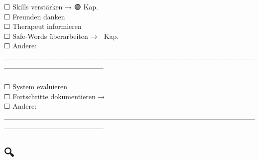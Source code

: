 \hfill\break
\hfill\break

\hypertarget{diese-woche}{%
\subsubsection[\textbf{\textcolor{ctmmBlue}{\1}}]{\texorpdfstring{\protect\hypertarget{diese-woche}{}{}\textbf{\textcolor{ctmmBlue}{\1}}}{Diese Woche:}}\label{diese-woche}}

☐ Skills verstärken → 🟢 Kap.\textbf{\textcolor{ctmmBlue}{\1}}\\
☐ Freunden danken\\
☐ Therapeut informieren\\
☐ Safe-Words überarbeiten → 🔴 Kap.\textbf{\textcolor{ctmmBlue}{\1}}\\
☐ Andere: \_\_\_\_\_\_\_\_\_\_\_\_\_\_\_\_\_\_\_\_\_\_\_\_\_\_\_\_\_\_\_\_\_\_\_\_\_\_\_\_\_\_\_\_\_\_\_\_\_\_\_\_\_\_\_\_\_\_\_\_\_\_\_\_\_\_\_

\hypertarget{nuxe4chsten-monat}{%
\subsubsection[\textbf{\textcolor{ctmmBlue}{\1}}]{\texorpdfstring{\protect\hypertarget{nuxe4chsten-monat}{}{}\textbf{\textcolor{ctmmBlue}{\1}}}{Nächsten Monat:}}\label{nuxe4chsten-monat}}

☐ System evaluieren\\
☐ Fortschritte dokumentieren → 📝 \textbf{\textcolor{ctmmBlue}{\1}}\\
☐ Andere: \_\_\_\_\_\_\_\_\_\_\_\_\_\_\_\_\_\_\_\_\_\_\_\_\_\_\_\_\_\_\_\_\_\_\_\_\_\_\_\_\_\_\_\_\_\_\_\_\_\_\_\_\_\_\_\_\_\_\_\_\_\_\_\_\_\_\_

\hfill\break
\hfill\break

\hypertarget{muster-erkennung}{%
\subsection[🔍 \ul{\textbf{\textcolor{ctmmBlue}{\1}}}]{\texorpdfstring{\protect\hypertarget{muster-erkennung}{}{}🔍 \ul{\textbf{\textcolor{ctmmBlue}{\1}}}}{🔍 MUSTER-ERKENNUNG}}\label{muster-erkennung}}

\hypertarget{uxe4hnliche-situationen}{%
\subsubsection[\textbf{\textcolor{ctmmBlue}{\1}}]{\texorpdfstring{\protect\hypertarget{uxe4hnliche-situationen}{}{}\textbf{\textcolor{ctmmBlue}{\1}}}{Ähnliche Situationen:}}\label{uxe4hnliche-situationen}}

